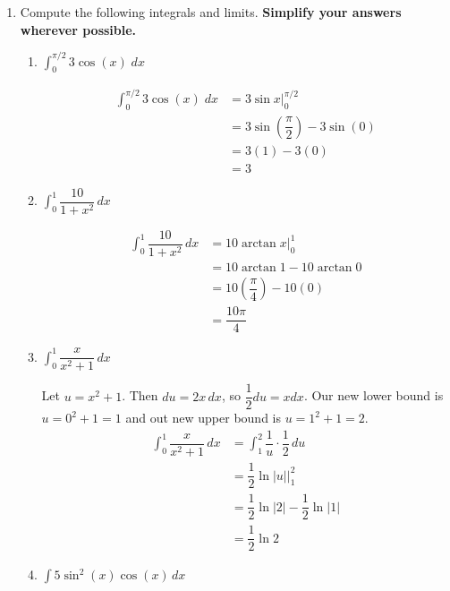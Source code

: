 \documentclass{article}
\begin{document}
\begin{enumerate}

  \item \label{Problem1-2023Final}
  
  Compute the following integrals and limits. \textbf{Simplify your answers wherever possible.} 
  

  \begin{enumerate}
      \item $\displaystyle \int_0^{\pi/2} 3\cos(x)\;dx$
      
      \begin{solution}
          \begin{align*}
          \displaystyle \int_0^{\pi/2} 3\cos(x)\;dx &=  3 \sin x \Big|_0^{\pi/2} \\
          &= 3\sin(\dfrac{\pi}{2})-3\sin(0)\\
          &= 3(1)-3(0)\\
          &= \boxed{3}
      \end{align*}
      \end{solution}

      \vfill
      
      \item $\displaystyle \int_0^1 \dfrac{10}{1+x^2}\, dx$

      \begin{solution}
      \begin{align*}
          \displaystyle \int_0^1 \dfrac{10}{1+x^2}\, dx &= 10\arctan x \Big|_0^1\\
          &= 10\arctan1-10\arctan0\\
          &= 10\left(\dfrac{\pi}{4}\right)-10(0)\\
        &= \boxed{\dfrac{10\pi}{4}}
      \end{align*}
      \end{solution}
      \vfill
      \item $ \displaystyle \int_0^1 \dfrac{x}{x^2+1}\, dx$
      
      \begin{solution}
          Let $u=x^2+1$. Then $du=2x\,dx$, so $\dfrac{1}{2}du = xdx$. Our new lower bound is $u=0^2+1=1$ and out new upper bound is $u=1^2+1=2$.
          \begin{align*}
              \displaystyle \int_0^1 \dfrac{x}{x^2+1}\, dx &= \displaystyle \int_1^2 \dfrac{1}{u} \cdot \dfrac{1}{2} \, du\\
              &= \dfrac{1}{2}\ln|u| \Big|_1^2\\
              &= \dfrac{1}{2}\ln|2|-\dfrac{1}{2}\ln|1|\\
              &= \boxed{\dfrac{1}{2}\ln 2}
          \end{align*}
      \end{solution}
      \vfill
      \pagebreak
      \item $\displaystyle \int 5\sin^2(x)\cos(x)\, dx$


\end{enumerate}
\end{enumerate}
\end{document}
